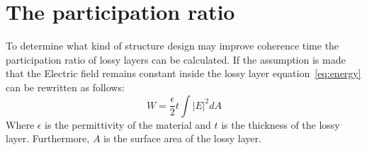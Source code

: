 \section{The participation ratio}
To determine what kind of structure design may improve coherence time the participation ratio of lossy layers can be calculated. If the assumption is made that the Electric field remains constant inside the lossy layer equation~\eqref{eq:energy} can be rewritten as follows:
\begin{equation}\label{eq:energy_layer}
W = \frac{\epsilon}{2}t\int{|E|}^{2}dA
\end{equation}
Where \(\epsilon\) is the permittivity of the material and \(t\) is the thickness of the lossy layer. Furthermore, \(A\) is the surface area of the lossy layer.


